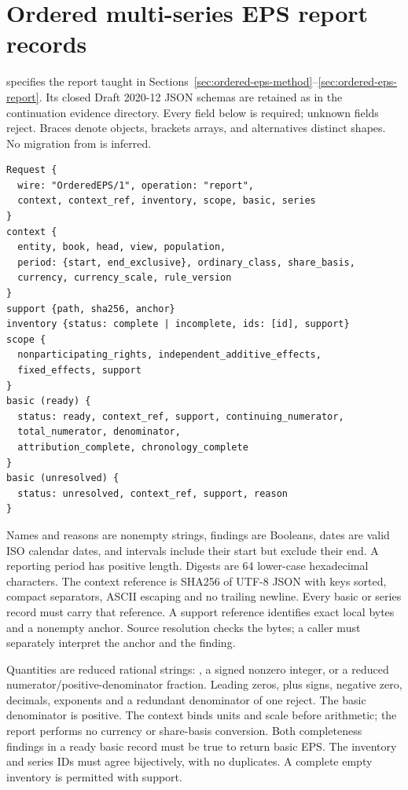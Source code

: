 \section{Ordered multi-series EPS report records}
\label{sec:ordered-eps-records}

 specifies the report taught in
Sections~\ref{sec:ordered-eps-method}--\ref{sec:ordered-eps-report}.
Its closed Draft 2020-12 JSON schemas are retained as
 in the continuation evidence directory.
Every field below is required; unknown fields reject. Braces denote objects,
brackets arrays, and alternatives distinct shapes. No migration from
 is inferred.

\begin{lstlisting}
Request {
  wire: "OrderedEPS/1", operation: "report",
  context, context_ref, inventory, scope, basic, series
}
context {
  entity, book, head, view, population,
  period: {start, end_exclusive}, ordinary_class, share_basis,
  currency, currency_scale, rule_version
}
support {path, sha256, anchor}
inventory {status: complete | incomplete, ids: [id], support}
scope {
  nonparticipating_rights, independent_additive_effects,
  fixed_effects, support
}
basic (ready) {
  status: ready, context_ref, support, continuing_numerator,
  total_numerator, denominator,
  attribution_complete, chronology_complete
}
basic (unresolved) {
  status: unresolved, context_ref, support, reason
}
\end{lstlisting}

Names and reasons are nonempty strings, findings are Booleans, dates are
valid ISO calendar dates, and intervals include their start but exclude their
end. A reporting period has positive length. Digests are 64 lower-case
hexadecimal characters. The context reference is SHA256 of UTF-8 JSON with
keys sorted, compact separators, ASCII escaping and no trailing newline.
Every basic or series record must carry that reference. A support reference
identifies exact local bytes and a nonempty anchor. Source resolution checks
the bytes; a caller must separately interpret the anchor and the finding.

Quantities are reduced rational strings: , a signed nonzero integer,
or a reduced numerator/positive-denominator fraction. Leading zeros, plus
signs, negative zero, decimals, exponents and a redundant denominator of one
reject. The basic denominator is positive. The context binds units and scale
before arithmetic; the report performs no currency or share-basis conversion.
Both completeness findings in a ready basic record must be true to return
basic EPS. The inventory and series IDs must agree bijectively, with no
duplicates. A complete empty inventory is permitted with support.

